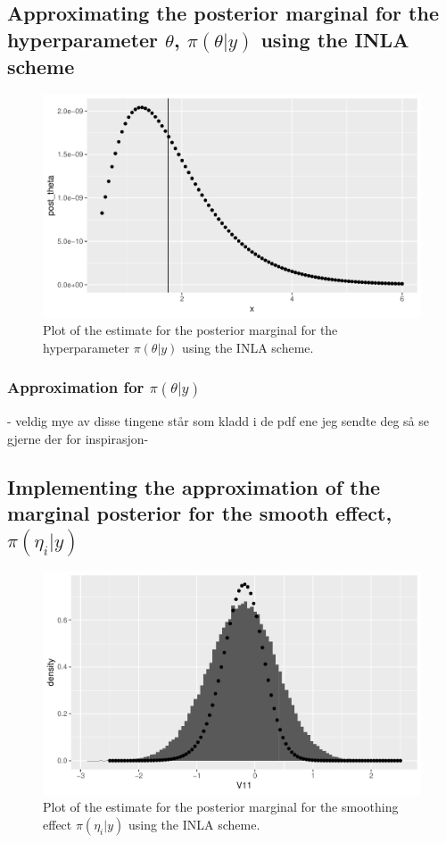 \subsection{Approximating the posterior marginal for the hyperparameter $\theta$, $\pi(\theta|y)$ using the INLA scheme}

\begin{figure}[h!]
    \centering
    \includegraphics[width=\textwidth]{Images/post_theta_inla.pdf}
    \caption{Plot of the estimate for the posterior marginal for the hyperparameter $\pi(\theta|y)$ using the INLA scheme.}
    \label{fig:post_theta_inla}
\end{figure}
 
 
\subsubsection{Approximation for $\pi(\theta|y)$}


- veldig mye av disse tingene står som kladd i de pdf ene jeg sendte deg så se gjerne der for inspirasjon-


\subsection{Implementing the approximation of the marginal posterior for the smooth effect, $\pi(\eta_i | y)$}

\begin{figure}[h!]
    \centering
    \includegraphics[width=\textwidth]{Images/post_eta_inla.pdf}
    \caption{Plot of the estimate for the posterior marginal for the smoothing effect $\pi(\eta_i|y)$ using the INLA scheme.}
    \label{fig:post_eta_inla}
\end{figure}



